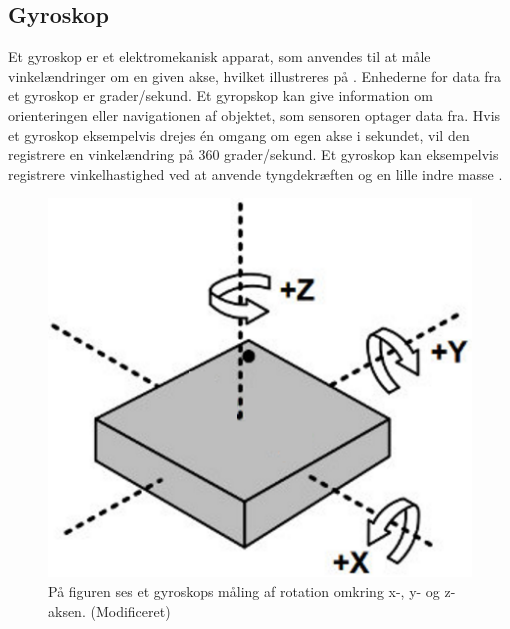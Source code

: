 \subsection{Gyroskop}
Et gyroskop er et elektromekanisk apparat, som anvendes til at måle vinkelændringer om en given akse, hvilket illustreres på . Enhederne for data fra et gyroskop er grader/sekund. \newline
Et gyropskop kan give information om orienteringen eller navigationen af objektet, som sensoren optager data fra. Hvis et gyroskop eksempelvis drejes én omgang om egen akse i sekundet, vil den registrere en vinkelændring på 360 grader/sekund. \citep{Sparkfun_gyro,Barbour2014} \newline
Et gyroskop kan eksempelvis registrere vinkelhastighed ved at anvende tyngdekræften og en lille indre masse \citep{Sparkfun_gyro,Barbour2014}.
\begin{figure}[H]
	\centering
	\includegraphics[scale=0.6]{figures/bProblemloesning/gyro.png}
	\caption{På figuren ses et gyroskops måling af rotation omkring x-, y- og z-aksen. \citep{Sparkfun_gyro} (Modificeret)}
	\label{fig:gyro}
\end{figure}


